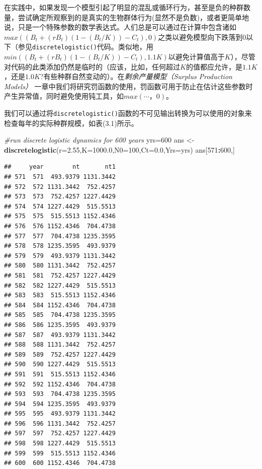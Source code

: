 \documentclass[
  lang=cn,
  11pt,
  scheme=chinese,
  chinesefont=nofont,
  citestyle=gb7714-2015,
  bibstyle=gb7714-2015]{elegantbook}
\newenvironment{Shaded}{\begin{snugshade}}{\end{snugshade}}
\newcommand{\AttributeTok}[1]{\textcolor[rgb]{0.13,0.29,0.53}{#1}}
\newcommand{\CommentTok}[1]{\textcolor[rgb]{0.56,0.35,0.01}{\textit{#1}}}
\newcommand{\DecValTok}[1]{\textcolor[rgb]{0.00,0.00,0.81}{#1}}
\newcommand{\FloatTok}[1]{\textcolor[rgb]{0.00,0.00,0.81}{#1}}
\newcommand{\FunctionTok}[1]{\textcolor[rgb]{0.13,0.29,0.53}{\textbf{#1}}}
\newcommand{\NormalTok}[1]{#1}
\newcommand{\OtherTok}[1]{\textcolor[rgb]{0.56,0.35,0.01}{#1}}
\newcommand{\SpecialCharTok}[1]{\textcolor[rgb]{0.81,0.36,0.00}{\textbf{#1}}}
\begin{document}
在实践中，如果发现一个模型引起了明显的混乱或循环行为，甚至是负的种群数量，尝试确定所观察到的是真实的生物群体行为(显然不是负数)，或者更简单地说，只是一个特殊参数的数学表达式。人们总是可以通过在计算中包含诸如\(max((B_t+(rB_t)(1-(B_t/K))-C_t),0)\)之类以避免模型向下跌落到0以下（参见\texttt{discretelogistic()}代码。类似地，用\(min((B_t+(rB_t)(1-(B_t/K))-C_t),1.1K)\)以避免计算值高于\(K\)），尽管对代码的此类添加仍然是临时的（应该，比如，任何超过\(K\)的值都应允许，是\(1.1K\)，还是\(1.0K\)?有些种群自然变动的）。在\emph{剩余产量模型（Surplus Production Models）} 一章中我们将研究罚函数的使用，罚函数可用于防止在估计这些参数时产生异常值，同时避免使用钝工具，如\(max(\cdots，0)\)。

我们可以通过将\texttt{discretelogistic()}函数的不可见输出转换为可以使用的对象来检查每年的实际种群规模，如表(3.1)所示。

\begin{Shaded}
\begin{Highlighting}[]
\CommentTok{\#run discrete logistic dynamics for 600 years  }
\NormalTok{yrs}\OtherTok{=}\DecValTok{600}  
\NormalTok{ans }\OtherTok{\textless{}{-}} \FunctionTok{discretelogistic}\NormalTok{(}\AttributeTok{r=}\FloatTok{2.55}\NormalTok{,}\AttributeTok{K=}\FloatTok{1000.0}\NormalTok{,}\AttributeTok{N0=}\DecValTok{100}\NormalTok{,}\AttributeTok{Ct=}\FloatTok{0.0}\NormalTok{,}\AttributeTok{Yrs=}\NormalTok{yrs)  }
\NormalTok{ans[}\DecValTok{571}\SpecialCharTok{:}\DecValTok{600}\NormalTok{,]}
\end{Highlighting}
\end{Shaded}

\begin{verbatim}
##     year        nt       nt1
## 571  571  493.9379 1131.3442
## 572  572 1131.3442  752.4257
## 573  573  752.4257 1227.4429
## 574  574 1227.4429  515.5513
## 575  575  515.5513 1152.4346
## 576  576 1152.4346  704.4738
## 577  577  704.4738 1235.3595
## 578  578 1235.3595  493.9379
## 579  579  493.9379 1131.3442
## 580  580 1131.3442  752.4257
## 581  581  752.4257 1227.4429
## 582  582 1227.4429  515.5513
## 583  583  515.5513 1152.4346
## 584  584 1152.4346  704.4738
## 585  585  704.4738 1235.3595
## 586  586 1235.3595  493.9379
## 587  587  493.9379 1131.3442
## 588  588 1131.3442  752.4257
## 589  589  752.4257 1227.4429
## 590  590 1227.4429  515.5513
## 591  591  515.5513 1152.4346
## 592  592 1152.4346  704.4738
## 593  593  704.4738 1235.3595
## 594  594 1235.3595  493.9379
## 595  595  493.9379 1131.3442
## 596  596 1131.3442  752.4257
## 597  597  752.4257 1227.4429
## 598  598 1227.4429  515.5513
## 599  599  515.5513 1152.4346
## 600  600 1152.4346  704.4738
\end{verbatim}
\end{document}

